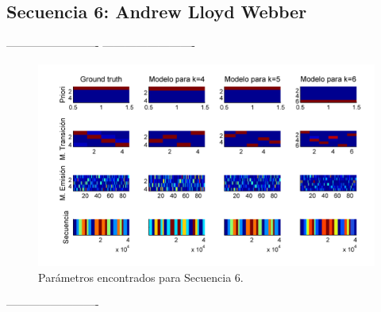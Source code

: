 \newpage
\subsection{Secuencia 6: Andrew Lloyd Webber}

-------------------------
-------------------------

\begin{figure}[H]
  \centerline
  {\includegraphics[width=1.3\linewidth]{gfx/chap6/cats1}} \quad
  \caption{Parámetros encontrados para Secuencia 6.}
  \label{fig:prb1_par}
\end{figure}

-------------------------

